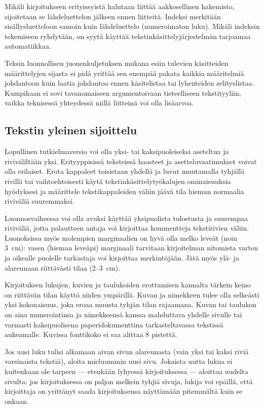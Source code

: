 \documentclass[finnish,gradu]{tktltiki}
\begin{document}
 

Mikäli kirjoitukseen erityissyistä halutaan
liittää aakkosellinen hakemisto, sijoitetaan
 se lähdeluettelon jälkeen
ennen liitteitä. Indeksi merkitään
 sisällysluetteloon samoin kuin
lähdeluettelo (numeroimaton luku). Mikäli
 indeksin tekemiseen
ryhdytään, on syytä käyttää
 tekstinkäsittelyjärjestelmän tarjoamaa
automatiikkaa.

Teksin luonnollisen juonenkuljetuksen mukana esiin
tulevien käsitteiden määrittelyjen sijasta ei pidä yrittää sen enempää
pakata kaikkia määritelmiä johdantoon kuin laatia johdantoa ennen
käsitelistaa tai lyhenteiden selityslistaa. Kumpikaan ei sovi
tavanomaiseen argumentoivaan tieteelliseen tekstityyliin, vaikka
teknisessä yhteydessä niillä liitteinä voi olla lisäarvoa.


\subsection{Tekstin yleinen sijoittelu}

Lopullinen tutkielmaversio voi olla yksi- tai kaksipuoleiseksi aseteltua
ja riviväliltään yksi.  Erityyppisissä
teksteissä haasteet ja asetteluvaatimukset voivat olla erilaiset. Erota
kappaleet toisistaan yhdellä ja luvut muutamalla tyhjällä rivillä tai
vaihtoehtoisesti käytä tekstinkäsittelytyökalujen ominaisuuksia
hyödyksesi ja määrittele tekstikappaleiden väliin jäävä tila hieman
normaalia riviväliä suuremmaksi.

Luonnosvaiheessa voi olla avuksi käyttää yksipuolista tulostusta ja 
suurempaa riviväliä,  jotta palautteen antaja voi kirjoittaa kommentteja
tekstirivien väliin. Luonoksissa myös molempien marginaalien on hyvä olla
melko leveät (noin 3~cm): vasen (hieman leveäpi) marginaali tarvitaan kirjoitelman
nitomista varten ja oikealle puolelle tarkastaja voi kirjoittaa
merkintöjään.  Jätä myös ylä- ja alareunaan riittävästi tilaa (2--3~cm).

Kirjoituksen lukujen, kuvien ja taulukoiden erottumisen kannalta
tärkein
 keino on riittävän tilan käyttö niiden ympärillä. Kuvan ja
nimekkeen tulee olla selkeästi yksi kokonaisuus, joka eroaa muusta
tyhjän tilan rajaamana. Kuvan tai taulukon on aina numerointinsa ja
nimekkeensä kanssa mahduttava yhdelle sivulle tai varmasti
kaksipuolisena paperidokumenttina tarkasteltavassa tekstissä aukeamalle.
Kuvissa fonttikoko ei saa alittaa 8 pistettä.



Jos uusi luku tulisi
 alkamaan aivan sivun alareunasta (vain yksi tai
kaksi riviä varsinaista
 tekstiä), aloita mieluummin uusi sivu. Jokaista
uutta lukua ei
 kuitenkaan ole tarpeen --- etenkään lyhyessä
kirjoituksessa --- aloittaa
 uudelta sivulta: jos kirjoituksessa on
paljon melkein tyhjiä sivuja,
 lukija voi epäillä, että kirjoittaja on
yrittänyt saada kirjoituksensa
 näyttämään pitemmältä kuin se onkaan.
 
\end{document}

